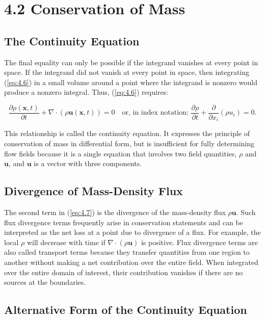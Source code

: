 \documentclass{article}
\begin{document}
\section{4.2 Conservation of Mass}

\subsection{The Continuity Equation}

The final equality can only be possible if the integrand vanishes at every point in space. If the integrand did not vanish at every point in space, then integrating (\ref{eq:4.6}) in a small volume around a point where the integrand is nonzero would produce a nonzero integral. Thus, (\ref{eq:4.6}) requires:

\begin{equation}
\frac{\partial\rho(\mathbf{x}, t)}{\partial t} + \nabla\cdot(\rho\mathbf{u}(\mathbf{x}, t)) = 0 \quad\text{or, in index notation: } \frac{\partial\rho}{\partial t} + \frac{\partial}{\partial x_i}(\rho u_i) = 0.\tag{4.7}
\end{equation}

This relationship is called the continuity equation. It expresses the principle of conservation of mass in differential form, but is insufficient for fully determining flow fields because it is a single equation that involves two field quantities, $\rho$ and $\mathbf{u}$, and $\mathbf{u}$ is a vector with three components.

\subsection{Divergence of Mass-Density Flux}

The second term in (\ref{eq:4.7}) is the divergence of the mass-density flux $\rho\mathbf{u}$. Such flux divergence terms frequently arise in conservation statements and can be interpreted as the net loss at a point due to divergence of a flux. For example, the local $\rho$ will decrease with time if $\nabla\cdot(\rho\mathbf{u})$ is positive. Flux divergence terms are also called transport terms because they transfer quantities from one region to another without making a net contribution over the entire field. When integrated over the entire domain of interest, their contribution vanishes if there are no sources at the boundaries.

\subsection{Alternative Form of the Continuity Equation}
\end{document}
